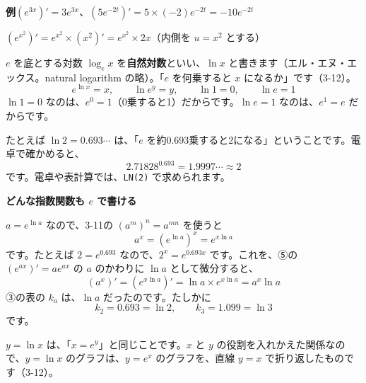 \noindent\textbf{例}\quad $(e^{3x})'=3e^{3x}$、\quad $(5e^{-2t})'=5\times(-2)e^{-2t}=-10e^{-2t}$\par
\noindent\hspace*{2.5\zw}$(e^{x^2})'=e^{x^2}\times(x^2)'=e^{x^2}\times2x$（内側を $u=x^2$ とする）


\label{bk:5-14:ln}$e$ を底とする対数 $\log_e x$ を\textbf{自然対数}といい、$\ln x$ と書きます（エル・エヌ・エックス。natural logarithm の略）。「$e$ を何乗すると $x$ になるか」です（3-12）。
\[ e^{\ln x}=x,\qquad \ln e^{y}=y,\qquad \ln1=0,\qquad \ln e=1 \]
$\ln1=0$ なのは、$e^0=1$（0乗すると1）だからです。$\ln e=1$ なのは、$e^1=e$ だからです。

たとえば $\ln2=0.693\cdots$ は、「$e$ を約0.693乗すると2になる」ということです。電卓で確かめると、
\[ 2.71828^{0.693}=1.9997\cdots\approx2 \]
です。電卓や表計算では、\texttt{LN(2)} で求められます。

\noindent\textbf{どんな指数関数も $e$ で書ける}\par
$a=e^{\ln a}$ なので、3-11の $(a^m)^n=a^{mn}$ を使うと
\[ a^x=(e^{\ln a})^x=e^{x\ln a} \]
です。たとえば $2=e^{0.693}$ なので、$2^x=e^{0.693x}$ です。これを、⑤の $(e^{ax})'=ae^{ax}$ の $a$ のかわりに $\ln a$ として微分すると、
\[ (a^x)'=(e^{x\ln a})'=\ln a\times e^{x\ln a}=a^x\ln a \]
③の表の $k_a$ は、$\ln a$ だったのです。たしかに
\[ k_2=0.693=\ln2,\qquad k_3=1.099=\ln3 \]
です。


\label{bk:5-14:lnbibun}$y=\ln x$ は、「$x=e^y$」と同じことです。$x$ と $y$ の役割を入れかえた関係なので、$y=\ln x$ のグラフは、$y=e^x$ のグラフを、直線 $y=x$ で折り返したものです（3-12）。

